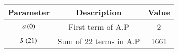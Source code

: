 \renewcommand{\arraystretch}{2}
\begin{tabular}{|c|c|c|}
\hline 
\setlength{\tabcolsep}{1pt}
\textbf{Parameter}  &\textbf{Description} &\textbf{Value} \\
\hline
$a\left(0\right)$ & First term of A.P & 2 \\
\hline
$S\left(21\right)$ & Sum of 22 terms in A.P & 1661 \\
\hline
\end{tabular}
